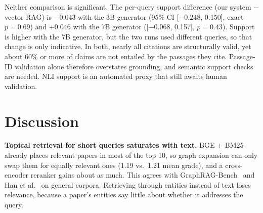\documentclass[conference]{IEEEtran}
\begin{document}
\begin{table}[t]
\centering
\caption{Answer grounding at a matched budget}
\label{tab:grounding}
\end{table}

Neither comparison is significant. The per-query support difference (our system $-$ vector RAG) is $-0.043$ with the 3B generator (95\% CI [$-0.248$, 0.150], exact $p = 0.69$) and $+0.046$ with the 7B generator ([$-0.068$, 0.157], $p = 0.43$). Support is higher with the 7B generator, but the two runs used different queries, so that change is only indicative. In both, nearly all citations are structurally valid, yet about 60\% or more of claims are not entailed by the passages they cite. Passage-ID validation alone therefore overstates grounding, and semantic support checks are needed. NLI support is an automated proxy that still awaits human validation.

\section{Discussion}

\textbf{Topical retrieval for short queries saturates with text.} BGE + BM25 already places relevant papers in most of the top 10, so graph expansion can only swap them for equally relevant ones (1.19 vs.\ 1.21 mean grade), and a cross-encoder reranker gains about as much. This agrees with GraphRAG-Bench~\cite{xiang2026whengraphs} and Han et al.~\cite{han2025ragvsgraphrag} on general corpora. Retrieving through entities instead of text loses relevance, because a paper's entities say little about whether it addresses the query.
\end{document}
